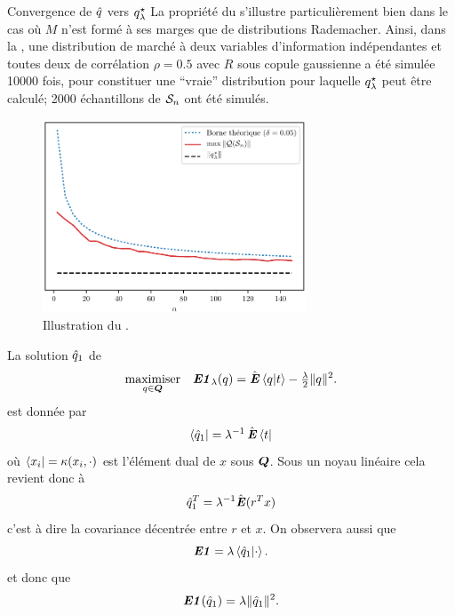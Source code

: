 \begin{numex}{Convergence de $\qh$ vers $\qsl$}
  La propriété du  s'illustre particulièrement bien dans le cas où
  $M$ n'est formé à ses marges que de distributions Rademacher. Ainsi, dans la
  , une distribution de marché à deux variables d'information
  indépendantes et toutes deux de corrélation $\rho=0.5$ avec $R$ sous copule gaussienne a
  été simulée \num{10000} fois, pour constituer une ``vraie'' distribution pour laquelle
  $\qsl$ peut être calculé; \num{2000} échantillons de $\S_n$ ont été simulés.
\begin{figure}
  \centering
  \includegraphics[width=0.7\textwidth]{../../experiments/fig/normqhqsl.pdf}
  \caption{Illustration du .}
  \label{fig:normqhqsl}
\end{figure}
\end{numex}


\begin{lemme}
  La solution $\qh_1$ de
  \begin{equation}
    \maximizeEquation[q \in \Q]{\EN_\lambda(q) = \hE\braket{q|t} - \tfrac{\lambda}{2}\|q\|^2.}
  \end{equation}
  est donnée par
  \begin{equation}
    \bra{\qh_1} = \lambda^{-1}\hE\bra{t}
  \end{equation}
  où $\bra{x_i} = \kappa(x_i,\cdot)$ est l'élément dual de $x$ sous $\Q$. Sous un noyau linéaire cela
  revient donc à 
  \begin{equation}
    \qh_1^T = \lambda^{-1}\hat\E(r^Tx)
  \end{equation}
  c'est à dire la covariance décentrée entre $r$ et $x$. On observera aussi que
  \begin{equation}
    \EN = \lambda\braket{\qh_1|\cdot}.
  \end{equation}
  et donc que
  \begin{equation}
    \EN(\qh_1) = \lambda\|\qh_1\|^2.
  \end{equation}
\end{lemme}

